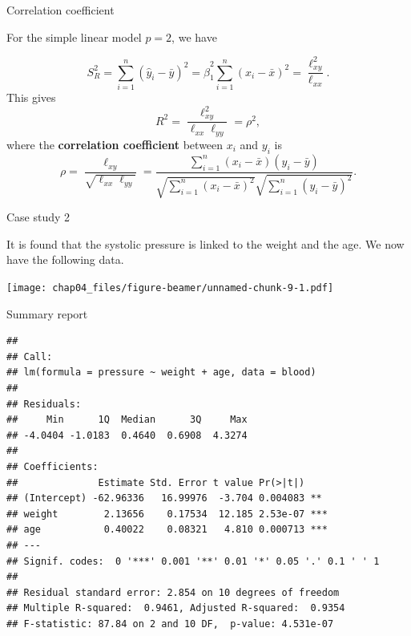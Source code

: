 \documentclass[ignorenonframetext,]{beamer}
\begin{document}
\begin{frame}{Correlation coefficient}
\protect\hypertarget{correlation-coefficient}{}

For the simple linear model \(p=2\), we have

\[S_R^2 = \sum_{i=1}^n(\hat y_i-\bar y)^2 = \hat\beta_1^2\sum_{i=1}^n(x_i-\bar x)^2 = \frac{\ell_{xy}^2}{\ell_{xx}}.\]
This gives \[R^2 = \frac{\ell_{xy}^2}{\ell_{xx}\ell_{yy}} = \rho^2,\]
where the \textbf{correlation coefficient} between \(x_i\) and \(y_i\)
is
\[\rho = \frac{\ell_{xy}}{\sqrt{\ell_{xx}\ell_{yy}}}=\frac{\sum_{i=1}^n(x_i-\bar x)(y_i-\bar y)}{\sqrt{\sum_{i=1}^n(x_i-\bar x)^2}\sqrt{\sum_{i=1}^n(y_i-\bar y)^2}}.\]

\end{frame}

\begin{frame}{Case study 2}
\protect\hypertarget{case-study-2}{}

It is found that the systolic pressure is linked to the weight and the
age. We now have the following data.

\texttt{[image: chap04\_files/figure-beamer/unnamed-chunk-9-1.pdf]}

\end{frame}

\begin{frame}[fragile]{Summary report}
\protect\hypertarget{summary-report-1}{}

\begin{verbatim}
## 
## Call:
## lm(formula = pressure ~ weight + age, data = blood)
## 
## Residuals:
##     Min      1Q  Median      3Q     Max 
## -4.0404 -1.0183  0.4640  0.6908  4.3274 
## 
## Coefficients:
##              Estimate Std. Error t value Pr(>|t|)    
## (Intercept) -62.96336   16.99976  -3.704 0.004083 ** 
## weight        2.13656    0.17534  12.185 2.53e-07 ***
## age           0.40022    0.08321   4.810 0.000713 ***
## ---
## Signif. codes:  0 '***' 0.001 '**' 0.01 '*' 0.05 '.' 0.1 ' ' 1
## 
## Residual standard error: 2.854 on 10 degrees of freedom
## Multiple R-squared:  0.9461, Adjusted R-squared:  0.9354 
## F-statistic: 87.84 on 2 and 10 DF,  p-value: 4.531e-07
\end{verbatim}

\end{frame}
\end{document}

